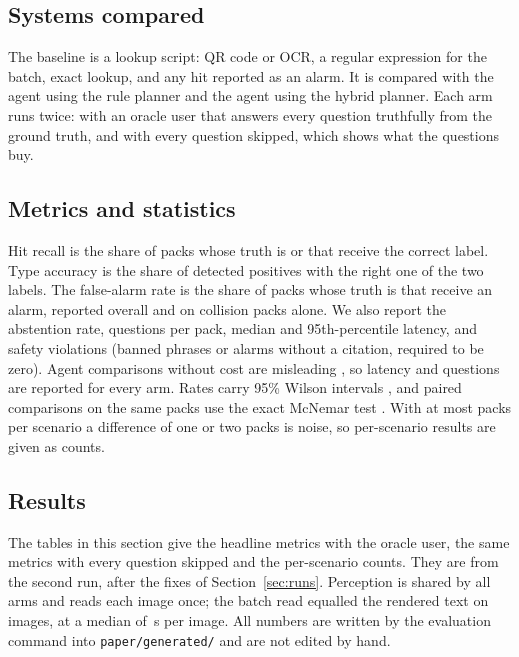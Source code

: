 \subsection{Systems compared}
The baseline is a lookup script: QR code or OCR, a regular expression for the batch, exact lookup, and any hit reported as an alarm. It is compared with the agent using the rule planner and the agent using the hybrid planner. Each arm runs twice: with an oracle user that answers every question truthfully from the ground truth, and with every question skipped, which shows what the questions buy.

\subsection{Metrics and statistics}
Hit recall is the share of packs whose truth is \FLAGGED{} or \SFAKE{} that receive the correct label. Type accuracy is the share of detected positives with the right one of the two labels. The false-alarm rate is the share of packs whose truth is \NLISTED{} that receive an alarm, reported overall and on collision packs alone. We also report the abstention rate, questions per pack, median and 95th-percentile latency, and safety violations (banned phrases or alarms without a citation, required to be zero). Agent comparisons without cost are misleading \cite{kapoor2024agents}, so latency and questions are reported for every arm. Rates carry 95\% Wilson intervals \cite{wilson1927probable,brown2001interval}, and paired comparisons on the same packs use the exact McNemar test \cite{mcnemar1947note,dietterich1998approximate}. With at most  packs per scenario a difference of one or two packs is noise, so per-scenario results are given as counts.

\subsection{Results}
\label{sec:results}
\ifresults
The tables in this section give the headline metrics with the oracle user, the same metrics with every question skipped and the per-scenario counts. They are from the second run, after the fixes of Section~\ref{sec:runs}. Perception is shared by all arms and reads each image once; the batch read equalled the rendered text on  images, at a median of \,s per image. All numbers are written by the evaluation command into \texttt{paper/generated/} and are not edited by hand.
\else
{}
\fi
